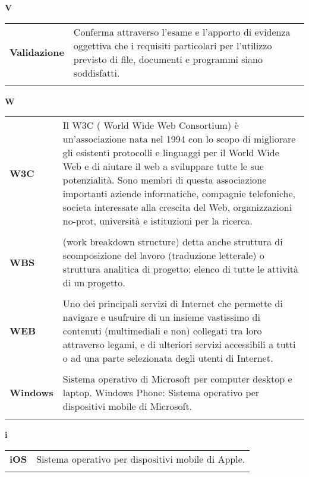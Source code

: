 {\begin{longtable}{L{4cm} p{10cm}}
 \\ 
\end{longtable} 
\newpage 
{} 
{} 
\hfill\Huge{\textbf{V}} \\ 
\normalsize 
\begin{longtable}{L{4cm} p{10cm}}
\textbf{Validazione} & Conferma attraverso l’esame e l'apporto di evidenza oggettiva che i requisiti particolari per l'utilizzo previsto di file, documenti e programmi siano soddisfatti. \\ 
 \\ 
\end{longtable} 
\newpage 
{} 
{} 
\hfill\Huge{\textbf{W}} \\ 
\normalsize 
\begin{longtable}{L{4cm} p{10cm}}
\textbf{W3C} & Il W3C ( World Wide Web Consortium) è un’associazione nata nel 1994 con lo scopo di migliorare gli esistenti protocolli e linguaggi per il World Wide Web e di aiutare il web a sviluppare tutte le sue potenzialità. Sono membri di questa associazione importanti aziende informatiche, compagnie telefoniche, societa interessate alla crescita del Web, organizzazioni no-prot, università e istituzioni per la ricerca. \\ 
 \\ 
\textbf{WBS} & (work breakdown structure) detta anche struttura di scomposizione del lavoro (traduzione letterale) o struttura analitica di progetto; elenco di tutte le attività di un progetto. \\ 
 \\ 
\textbf{WEB} & Uno dei principali servizi di Internet che permette di navigare e usufruire di un insieme vastissimo di contenuti (multimediali e non) collegati tra loro attraverso legami, e di ulteriori servizi accessibili a tutti o ad una parte selezionata degli utenti di Internet. \\ 
 \\ 
\textbf{Windows} & Sistema operativo di Microsoft per computer desktop e laptop. Windows Phone: Sistema operativo per dispositivi mobile di Microsoft. \\ 
 \\ 
\end{longtable} 
\newpage 
{} 
{} 
\hfill\Huge{\textbf{i}} \\ 
\normalsize 
\begin{longtable}{L{4cm} p{10cm}}
\textbf{iOS} & Sistema operativo per dispositivi mobile di Apple. \\ 
 \\ 
\end{longtable} 
 }